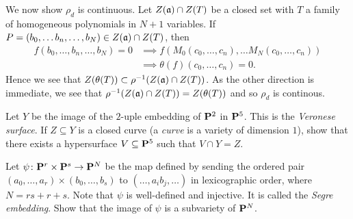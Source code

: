\documentclass[10pt]{amsart}
\begin{document}
\begin{solution}
\begin{luke}
\begin{enumerate}
        We now show $\rho_d$ is continuous. Let $Z(\mathfrak{a}) \cap Z(T)$ be a closed set 
        with $T$ a family of homogeneous polynomials in $N+1$ variables. If $P = 
        (b_0, \dots b_n, \dots, b_N) \in Z(\mathfrak{a}) \cap Z(T)$, then 
        \begin{align*}
            f(b_0, \dots, b_n, \dots, b_N) = 0
            &\implies 
            f(M_0(c_0, \dots, c_n), \dots M_N(c_0, \dots, c_n))\\
            &\implies 
            \theta(f)(c_0, \dots, c_n) = 0.
        \end{align*} 
        Hence we see that $Z(\theta(T)) \subset \rho^{-1}(Z(\mathfrak{a}) \cap Z(T))$. 
        As the other direction is immediate, we see that $\rho^{-1}(Z(\mathfrak{a}) \cap Z(T)) = Z(\theta(T))$ 
        and so $\rho_d$ is continous.

            
        \end{enumerate}
    \end{luke}
\end{solution}

\begin{exercise}[2.13]
    Let $Y$ be the image of the $2$-uple embedding of ${\bf P}^2$ in ${\bf P}^5$. This is the
    \emph{Veronese surface}. If $Z \subseteq Y$ is a closed curve (a \emph{curve} is 
    a variety of dimension $1$), show that there exists a hypersurface $V \subseteq
    {\bf P}^5$ such that $V \cap Y = Z$. 
\end{exercise}

\begin{solution}
    
\end{solution}

\begin{exercise}[2.14]
    Let $\psi\colon {\bf P}^r \times {\bf P}^s \to {\bf P}^N$ be the map defined by sending
    the ordered pair $(a_0, \ldots, a_r) \times (b_0, \ldots, b_s)$ to $(\ldots,
    a_ib_j, \ldots)$ in lexicographic order, where $N = rs + r +s$. Note that
    $\psi$ is well-defined and injective. It is called the \emph{Segre embedding}.
    Show that the image of $\psi$ is a subvariety of ${\bf P}^N$.
\end{exercise}
\end{document}
